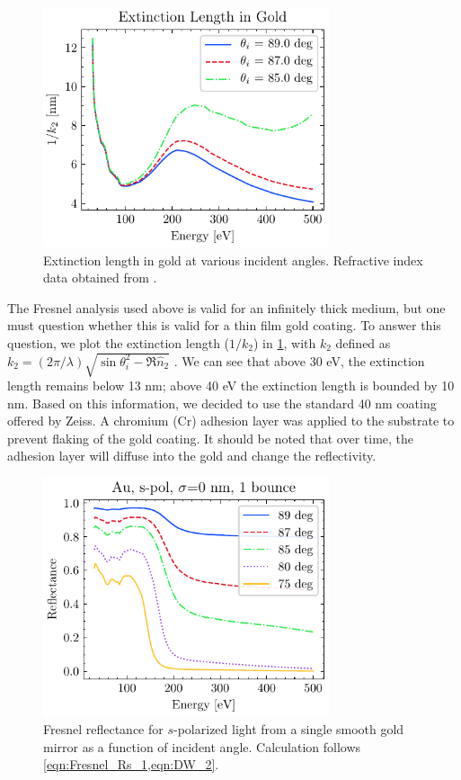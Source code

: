 \begin{figure}
	\centering
	\includegraphics[width=0.75\textwidth]{figures/chap2/Au_ExtinctionLength.pdf}
	\caption{Extinction length in gold at various incident angles. Refractive index data obtained from \cite{gulliksonCXROXRayInteractions,henkeXRayInteractionsPhotoabsorption1993}.}
	\label{fig:Au_Extinction_Length}
\end{figure}

The Fresnel analysis used above is valid for an infinitely thick medium, but one must question whether this is valid for a thin film gold coating. To answer this question, we plot the extinction length ($1/k_2$) in \cref{fig:Au_Extinction_Length}, with $k_2$ defined as ${ k_2 = \left( 2 \pi / \lambda \right) \sqrt{ \sin \theta_i^2 - \Re\hat{n}_2} }$ \cite{zangwillModernElectrodynamics2013}. We can see that above 30 eV, the extinction length remains below 13 nm; above 40 eV the extinction length is bounded by 10 nm. Based on this information, we decided to use the standard 40 nm coating offered by Zeiss. A chromium (Cr) adhesion layer was applied to the substrate to prevent flaking of the gold coating. It should be noted that over time, the adhesion layer will diffuse into the gold and change the reflectivity.

\begin{figure}
	\centering
	\includegraphics[width=0.75\textwidth]{figures/chap2/Au_ReflvsAngle.pdf}
	\caption{Fresnel reflectance for $s$-polarized light from a single smooth gold mirror as a function of incident angle. Calculation follows \cref{eqn:Fresnel_Rs_1,eqn:DW_2}.}
	\label{fig:Au_ReflvsAngle}
\end{figure}

